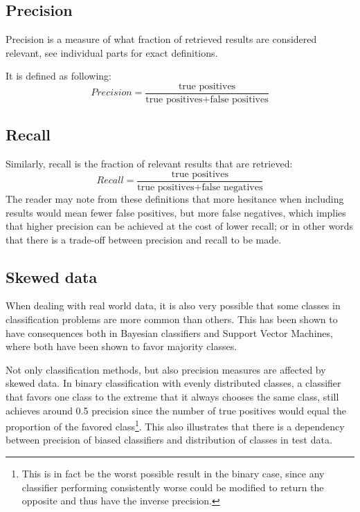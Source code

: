 \documentclass[a4paper,11pt]{kth-mag}
\begin{document}
\subsection{Precision}
Precision is a measure of what fraction of retrieved results are considered relevant, see individual parts for exact definitions.

It is defined as following:
\begin{equation} \label{eq:precision}
Precision = \frac{\text {true positives}}{\text{true positives} + \text{false positives}}
\end{equation}

\subsection{Recall}
Similarly, recall is the fraction of relevant results that are retrieved:
$$Recall = \frac{\text {true positives}}{\text{true positives} + \text{false negatives}}$$
The reader may note from these definitions that more hesitance when including results would mean fewer false positives, but more false negatives, which implies that higher precision can be achieved at the cost of lower recall; or in other words that there is a trade-off between precision and recall to be made.



\subsection{Skewed data}
\label{subsec:bias}
When dealing with real world data, it is also very possible that some classes in classification problems are more common than others. This has been shown to have consequences both in Bayesian classifiers\cite{rennie2003bias} and Support Vector Machines\cite{svm_bias}, where both have been shown to favor majority classes\cite{rennie2003bias, svm_bias}.

Not only classification methods, but also precision measures are affected by skewed data. In binary classification with evenly distributed classes, a classifier that favors one class to the extreme that it always chooses the same class, still achieves around 0.5 precision since the number of true positives would equal the proportion of the favored class\footnote{This is in fact be the worst possible result in the binary case, since any classifier performing consistently worse could be modified to return the opposite and thus have the inverse precision.}. This also illustrates that there is a dependency between precision of biased classifiers and distribution of classes in test data.
\end{document}
